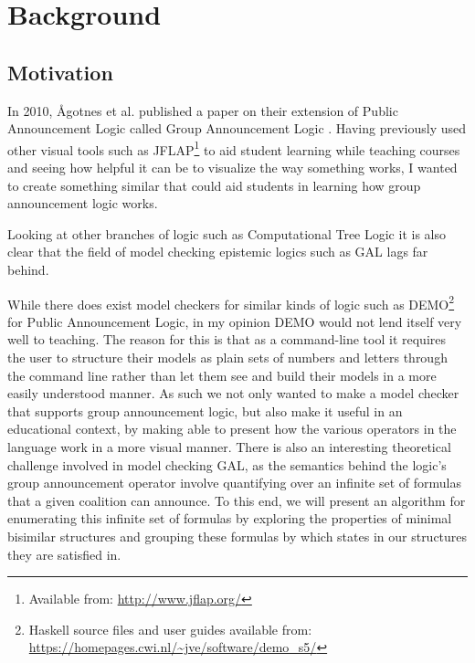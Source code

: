 \section{Background}\label{sec:back}

\subsection{Motivation}


In 2010, Ågotnes et al. published a paper on their extension of Public Announcement Logic called Group Announcement Logic \cite{Agotnes2014}. Having previously used other visual tools such as JFLAP\footnote{Available from: \url{http://www.jflap.org/}} to aid student learning while teaching courses and seeing how helpful it can be to visualize the way something works, I wanted to create something similar that could aid students in learning how group announcement logic works. 

Looking at other branches of logic such as Computational Tree Logic it is also clear that the field of model checking epistemic logics such as GAL lags far behind. 

While there does exist model checkers for similar kinds of logic such as DEMO\footnote{Haskell source files and user guides available from: \url{https://homepages.cwi.nl/~jve/software/demo_s5/}} for Public Announcement Logic, in my opinion DEMO would not lend itself very well to teaching. The reason for this is that as a command-line tool it requires the user to structure their models as plain sets of numbers and letters through the command line rather than let them see and build their models in a more easily understood manner. As such we not only wanted to make a model checker that supports group announcement logic, but also make it useful in an educational context, by making able to present how the various operators in the language work in a more visual manner. There is also an interesting theoretical challenge involved in model checking GAL, as the semantics behind the logic's group announcement operator involve quantifying over an infinite set of formulas that a given coalition can announce. To this end, we will present an algorithm for enumerating this infinite set of formulas by exploring the properties of minimal bisimilar structures and grouping these formulas by which states in our structures they are satisfied in. 

